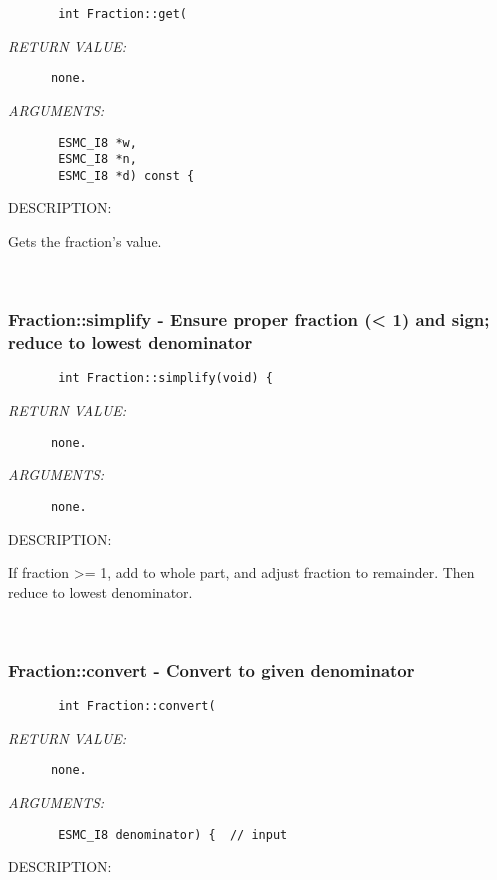   
\begin{verbatim}       int Fraction::get(\end{verbatim}{\em RETURN VALUE:}
\begin{verbatim}      none.\end{verbatim}{\em ARGUMENTS:}
\begin{verbatim}       ESMC_I8 *w,
       ESMC_I8 *n,
       ESMC_I8 *d) const {\end{verbatim}
{\sf DESCRIPTION:\\ }


       Gets the fraction's value.
   
 
\mbox{}\hrulefill\ 
 
\subsubsection [Fraction::simplify] {Fraction::simplify - Ensure proper fraction (< 1) and sign; reduce to lowest denominator}


  
\begin{verbatim}       int Fraction::simplify(void) {\end{verbatim}{\em RETURN VALUE:}
\begin{verbatim}      none.\end{verbatim}{\em ARGUMENTS:}
\begin{verbatim}      none.\end{verbatim}
{\sf DESCRIPTION:\\ }


       If fraction >= 1, add to whole part, and adjust fraction to remainder.
       Then reduce to lowest denominator.
   
 
\mbox{}\hrulefill\ 
 
\subsubsection [Fraction::convert] {Fraction::convert - Convert to given denominator}


  
\begin{verbatim}       int Fraction::convert(\end{verbatim}{\em RETURN VALUE:}
\begin{verbatim}      none.\end{verbatim}{\em ARGUMENTS:}
\begin{verbatim}       ESMC_I8 denominator) {  // input\end{verbatim}
{\sf DESCRIPTION:\\ }


